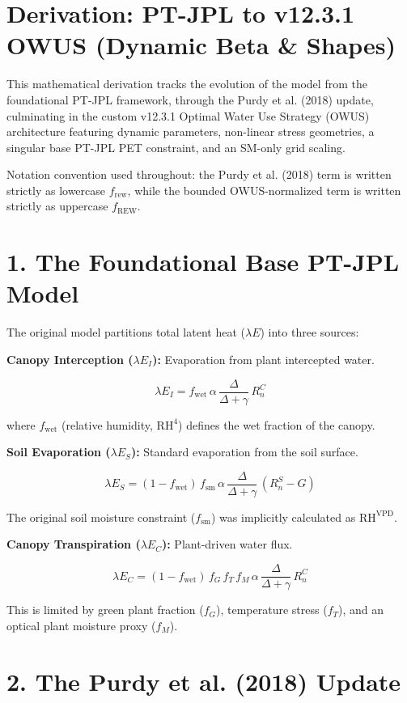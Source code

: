 \documentclass[11pt]{article}
\begin{document}
\section*{Derivation: PT-JPL to v12.3.1 OWUS (Dynamic Beta \& Shapes)}

This mathematical derivation tracks the evolution of the model from the foundational PT-JPL framework, through the Purdy et al. (2018) update, culminating in the custom v12.3.1 Optimal Water Use Strategy (OWUS) architecture featuring dynamic parameters, non-linear stress geometries, a singular base PT-JPL PET constraint, and an SM-only grid scaling.

Notation convention used throughout: the Purdy et al. (2018) term is written strictly as lowercase $f_{\mathrm{rew}}$, while the bounded OWUS-normalized term is written strictly as uppercase $f_{\mathrm{REW}}$.

\section*{1. The Foundational Base PT-JPL Model}

The original model partitions total latent heat ($\lambda E$) into three sources:

\textbf{Canopy Interception ($\lambda E_{I}$):} Evaporation from plant intercepted water.


$$\lambda E_{I} = f_{\mathrm{wet}}\,\alpha\,\frac{\Delta}{\Delta + \gamma}\,R_{n}^C$$


where $f_{\mathrm{wet}}$ (relative humidity, $\mathrm{RH}^4$) defines the wet fraction of the canopy.

\textbf{Soil Evaporation ($\lambda E_{S}$):} Standard evaporation from the soil surface.


$$\lambda E_{S} = (1 - f_{\mathrm{wet}})\,f_{\mathrm{sm}}\,\alpha\,\frac{\Delta}{\Delta + \gamma}\,(R_{n}^S - G)$$


The original soil moisture constraint ($f_{\mathrm{sm}}$) was implicitly calculated as $\mathrm{RH}^{\mathrm{VPD}}$.

\textbf{Canopy Transpiration ($\lambda E_{C}$):} Plant-driven water flux.


$$\lambda E_{C} = (1 - f_{\mathrm{wet}})\,f_{G}\,f_{T}\,f_{M}\,\alpha\,\frac{\Delta}{\Delta + \gamma}\,R_{n}^C$$


This is limited by green plant fraction ($f_{G}$), temperature stress ($f_{T}$), and an optical plant moisture proxy ($f_{M}$).

\section*{2. The Purdy et al. (2018) Update}
\end{document}
